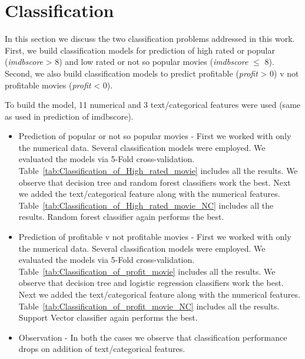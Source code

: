 \documentclass{article}%
\begin{document}
\section{Classification}

In this section we discuss the two classification problems addressed in this work. First, we build classification models for prediction of high rated or popular (\textit{imdbscore} > 8) and low rated or not so popular movies (\textit{imdbscore} $\leq$ 8). Second, we also build classification models to predict profitable (\textit{profit} > 0) v not profitable movies (\textit{profit} < 0).

To build the model, 11 numerical and 3 text/categorical features were used (same as used in prediction of imdbscore). 

\begin{itemize}
\item Prediction of popular or not so popular movies - First we worked with only the numerical data. Several classification models were employed. We evaluated the models via 5-Fold cross-validation. Table~\ref{tab:Classification_of_High_rated_movie} includes all the results. We observe that decision tree and random forest classifiers work the best. Next we added the text/categorical feature along with the numerical features. Table~\ref{tab:Classification_of_High_rated_movie_NC} includes all the results. Random forest classifier again performs the best. 
\item Prediction of profitable v not profitable movies - First we worked with only the numerical data. Several classification models were employed. We evaluated the models via 5-Fold cross-validation. Table~\ref{tab:Classification_of_profit_movie} includes all the results. We observe that decision tree and logistic regression classifiers work the best. Next we added the text/categorical feature along with the numerical features. Table~\ref{tab:Classification_of_profit_movie_NC} includes all the results. Support Vector classifier again performs the best. 
\item Observation - In both the cases we observe that classification performance drops on addition of text/categorical features. 
\end{itemize}
\end{document}
